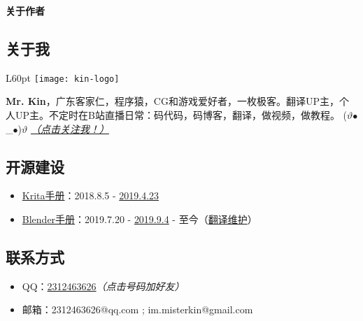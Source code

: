 \begin{center}
    {\bfseries\sffamily\Large 关于作者}
\end{center}

\subsection*{\bfseries \sffamily 关于我}
\begin{wrapfigure}[3]{L}{60pt}
    \vspace*{-20pt}
    \centering
    \texttt{[image: kin-logo]}
\end{wrapfigure}
\textbf{Mr. Kin}，广东客家仁，程序猿，CG和游戏爱好者，一枚极客。翻译UP主，个人UP主。不定时在B站直播日常：码代码，码博客，翻译，做视频，做教程。 ($\vartheta$$\bullet$\_$\bullet$)$\vartheta$ \hyperlink{follow}{\emph{（点击关注我！）}}

\subsection*{\bfseries \sffamily 开源建设}


\begin{itemize}
    \item \href{https://docs.krita.org/zh_CN/}{Krita手册}：2018.8.5 - \href{https://crowdin.com/profile}{2019.4.23}
    \item \href{https://docs.blender.org/manual/zh-hans/latest/}{Blender手册}：2019.7.20 - \href{https://www.blendercn.org/5812.html?tdsourcetag=s_pctim_aiomsg}{2019.9.4} - 至今（\href{https://developer.blender.org/p/Mr_Kin/}{翻译维护}）
\end{itemize}

\subsection*{\bfseries \sffamily \hypertarget{contact}{联系方式}}
\vspace*{-1ex}

\begin{itemize}
    \item QQ：\href{tencent://AddContact/?fromId=45&fromSubId=1&subcmd=all&uin=2312463626&website=www.oicqzone.com}{2312463626}\emph{\color{red}（点击号码加好友）}
    \item 邮箱：2312463626@qq.com ; im.misterkin@gmail.com
\end{itemize}

